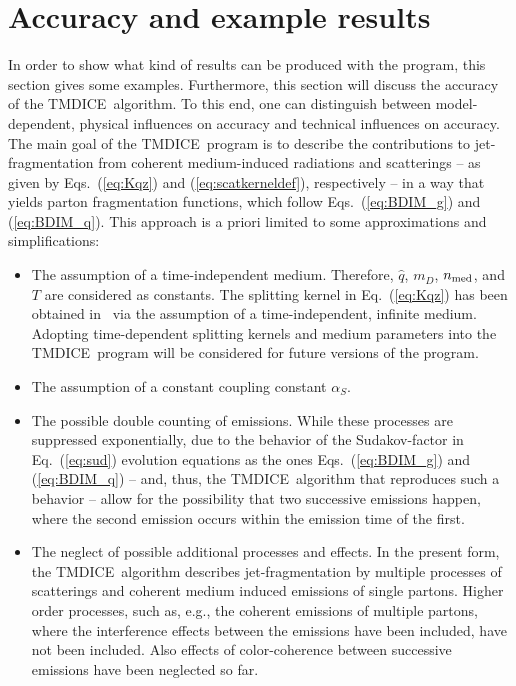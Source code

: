 \documentclass[preprint,12pt]{elsarticle}
\newcommand{\tmdice}{{\sf TMDICE}}
\begin{document}
\section{Accuracy and example results} 
\label{sec_ex}
%
In order to show what kind of results can be produced with the program, this section gives some examples.
Furthermore, this section will 
discuss the accuracy of the \tmdice~algorithm.
To this end, one can distinguish between model-dependent, physical influences on accuracy and technical influences on accuracy.
The main goal of the \tmdice~program is to describe the contributions to jet-fragmentation from coherent medium-induced radiations and scatterings -- as given by Eqs.~(\ref{eq:Kqz}) and (\ref{eq:scatkerneldef}), respectively -- in a way that yields parton fragmentation functions, which follow Eqs.~(\ref{eq:BDIM_g}) and (\ref{eq:BDIM_q}).
This approach is a priori limited to some approximations and simplifications:
\begin{itemize}
\item The assumption of a time-independent medium. Therefore, $\hat{q}$, $m_D$, $n_{\rm med}$, and $T$ are considered as constants. The splitting kernel in Eq.~(\ref{eq:Kqz}) has been obtained in~\cite{Blaizot:2012fh,Blaizot:2013vha,Blanco:2021usa} via the assumption of a time-independent, infinite medium. Adopting time-dependent splitting kernels and medium parameters into the \tmdice~program will be considered for future versions of the program.
\item The assumption of a constant coupling constant $\alpha_S$.
\item The possible double counting of emissions. While these processes are suppressed exponentially, due to the behavior of the Sudakov-factor in Eq.~(\ref{eq:sud}) evolution equations as the ones Eqs.~(\ref{eq:BDIM_g}) and (\ref{eq:BDIM_q}) -- and, thus, the \tmdice~algorithm that reproduces such a behavior -- allow for the possibility that two successive emissions happen, where the second emission occurs within the emission time of the first.
\item The neglect of possible additional processes and effects. In the present form, the \tmdice~algorithm describes jet-fragmentation by multiple processes of scatterings and coherent medium induced emissions of single partons. Higher order processes, such as, e.g., the coherent emissions of multiple partons, where the interference effects between the emissions have been included, have not been included. Also effects of color-coherence between successive emissions have been neglected so far.
\end{itemize}
\end{document}
